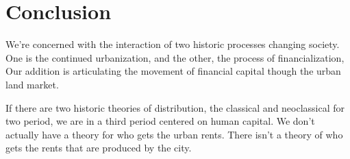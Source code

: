 \chapter{Conclusion} \label{chapter-conclusions}
We're concerned with the interaction of two historic processes changing society. One is the continued urbanization, and the other, the process of financialization, 
Our addition is 
articulating the movement of financial capital though the urban land market. 

If there are two historic theories of distribution, the classical and neoclassical for two period, we are in a third period centered on human capital. 
We don't actually have a theory for who gets the urban rents. 
There isn't %
a theory of who gets the rents that are produced by the city. 








